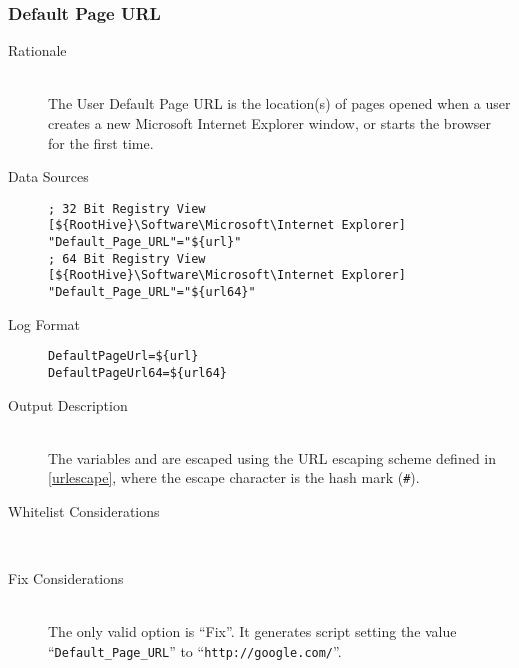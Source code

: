 \subsubsection{Default Page URL}
\begin{description}
\item[Rationale] \hfill \\
The User Default Page URL is the location(s) of pages opened when a user creates
a new Microsoft Internet Explorer window, or starts the browser for the first
time. 

\item[Data Sources] \hfill
\vspace{-\baselineskip}
\begin{verbatim}
; 32 Bit Registry View
[${RootHive}\Software\Microsoft\Internet Explorer]
"Default_Page_URL"="${url}"
; 64 Bit Registry View
[${RootHive}\Software\Microsoft\Internet Explorer]
"Default_Page_URL"="${url64}"
\end{verbatim}
\item[Log Format] \hfill
\vspace{-\baselineskip}
\begin{verbatim} 
DefaultPageUrl=${url}
DefaultPageUrl64=${url64}
\end{verbatim}
\item[Output Description] \hfill \\
The variables  and  are escaped using the URL escaping
scheme defined in \ref{urlescape}, where the escape character is the hash mark
(\verb|#|).
\item[Whitelist Considerations] \hfill \\

\item[Fix Considerations] \hfill \\
The only valid option is ``Fix''. It generates script setting the value
``\verb|Default_Page_URL|'' to ``\verb|http://google.com/|''.
\end{description}

